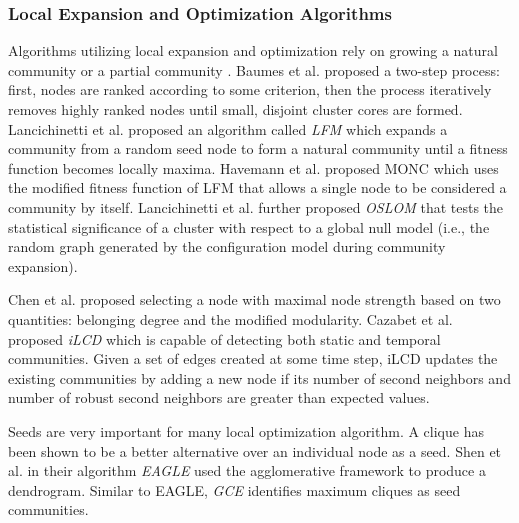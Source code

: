 \subsubsection*{Local Expansion and Optimization Algorithms}
Algorithms utilizing local expansion and optimization rely on growing a natural community or a partial community 
\cite{Lancichinetti033015}.  Baumes et al. \cite{BaumesGKMP05} proposed a two-step process: first, nodes are ranked according to some
criterion, then the
process iteratively removes highly ranked nodes until small, disjoint cluster cores are formed. Lancichinetti et al. \cite{Lancichinetti}
proposed an algorithm called {\em LFM} which expands a community from a random seed node to form a natural community until a fitness
function becomes locally maxima. Havemann et al. proposed MONC \cite{Havemann2010} which uses the modified fitness function of LFM that
allows a single node to be considered a community by itself.  Lancichinetti et al. further proposed {\em OSLOM}
\cite{pone.0018961} that  tests the statistical significance of a cluster \cite{Bianconi1407} with respect to a global null model
(i.e., the random graph generated by the configuration model \cite{Molloy:1995} during community expansion).

Chen et al. \cite{Chen20104177} proposed selecting a node with maximal node strength based on two quantities: belonging degree and the
modified
modularity. Cazabet et al. \cite{5591234} proposed {\em iLCD} which is capable of detecting both static and temporal communities. Given a
set of edges created at some time step, iLCD updates the existing communities by adding a new node if its number of second neighbors and
number of robust second neighbors are greater than expected values. 

Seeds are very important for many local optimization algorithm. A clique has been shown to be a better alternative over an individual node
as a seed. Shen et al. \cite{Shen20091706} in their algorithm {\em EAGLE} used the agglomerative framework to produce a dendrogram. Similar
to EAGLE, {\em GCE} \cite{Lee10} identifies maximum cliques as seed communities. 


